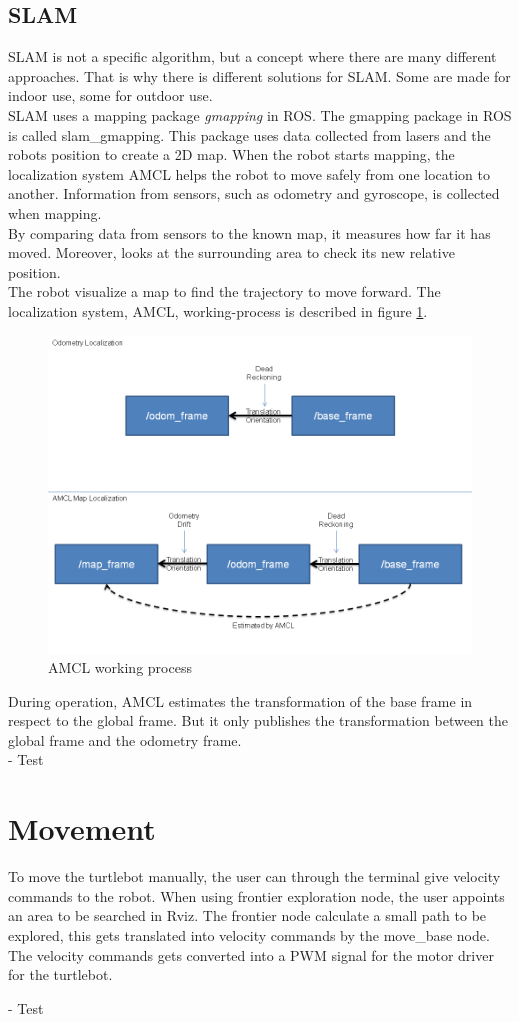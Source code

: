 \subsection{SLAM}
SLAM is not a specific algorithm, but a concept where there are many different approaches. That is why there is different solutions for SLAM. Some are made for indoor use, some for outdoor use.\\
SLAM uses a mapping package \textit{gmapping} in ROS. The gmapping package in ROS is called slam\_gmapping. This package uses data collected from lasers and the robots position to create a 2D map. %
When the robot starts mapping, the localization system AMCL helps the robot to move safely from one location to another.
Information from sensors, such as odometry and gyroscope, is collected when mapping. \\
By comparing data from sensors to the known map, it measures how far it has moved. Moreover, looks at the surrounding area to check its new relative position.\\The robot visualize a map to find the trajectory to move forward. The localization system, AMCL, working-process is described in figure \ref{fig:amcl}.
\begin{figure}
    \centering
    \includegraphics[width=.7\textwidth]{figures/AMCL.png}
    \caption{AMCL working process\cite{AMCL}} 
    \label{fig:amcl} 
\end{figure}
 During operation, AMCL estimates the transformation of the base frame in respect to the global frame. But it only publishes the transformation between the global frame and the odometry frame\cite{AMCL}.\\

- Test

%
%
%
%
\section{Movement}

To move the turtlebot manually, the user can through the terminal give velocity commands to the robot. When using frontier exploration node, the user appoints an area to be searched in Rviz. The frontier node calculate a small path to be explored, this gets translated into velocity commands by the move\_base node. The velocity commands gets converted into a PWM signal for the motor driver for the turtlebot.


- Test